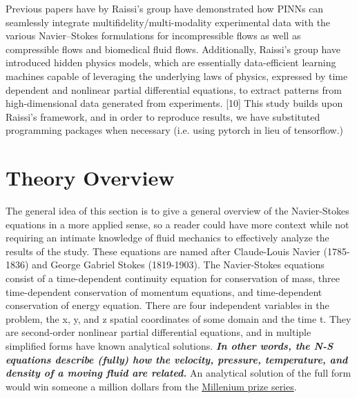 \documentclass{article}
\begin{document}
	Previous papers have by Raissi’s group have demonstrated how PINNs can seamlessly integrate multifidelity/multi-modality experimental data with the various Navier–Stokes formulations for incompressible flows \cite{DBLP:journals/corr/abs-1711-10561,DBLP:journals/corr/abs-1711-10566} as well as compressible flows \cite{physics-informed-machine-learning} and biomedical fluid flows. Additionally, Raissi’s group have introduced hidden physics models, which are essentially data-efficient learning machines capable of leveraging the underlying laws of physics, expressed by time dependent and nonlinear partial differential equations, to extract patterns from high-dimensional data generated from experiments. [10]
	This study builds upon Raissi’s framework, and in order to reproduce results, we have substituted programming packages when necessary (i.e. using pytorch in lieu of tensorflow.) 
    
    
    
	\section{Theory Overview} \label{theory}
	
	The general idea of this section is to give a general overview of the Navier-Stokes equations in a more applied sense, so a reader could have more context while not requiring an intimate knowledge of fluid mechanics to effectively analyze the results of the study. These equations are named after Claude-Louis Navier (1785-1836) and George Gabriel Stokes (1819-1903). The Navier-Stokes equations consist of a time-dependent continuity equation for conservation of mass, three time-dependent conservation of momentum equations, and time-dependent conservation of energy equation. There are four independent variables in the problem, the x, y, and z spatial coordinates of some domain and the time t.\cite{NASA} They are second-order nonlinear partial differential equations, and in multiple simplified forms have known analytical solutions. \textit{\textbf{In other words, the N-S equations describe (fully) how the velocity, pressure, temperature, and density of a moving fluid are related.}} An analytical solution of the full form would win someone a million dollars from the 	\href{https://www.claymath.org/millennium-problems/navier%E2%80%93stokes-equationURL}{Millenium prize series}. \\
	
	
\end{document}
